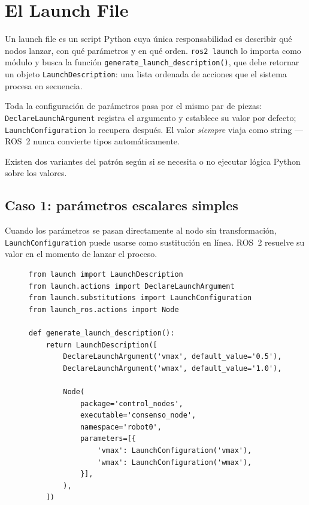 \section{El Launch File}

Un launch file es un script Python cuya única responsabilidad es describir qué nodos lanzar, con qué parámetros y en qué orden. \texttt{ros2 launch} lo importa como módulo y busca la función \texttt{generate\_launch\_description()}, que debe retornar un objeto \texttt{LaunchDescription}: una lista ordenada de acciones que el sistema procesa en secuencia.

Toda la configuración de parámetros pasa por el mismo par de piezas: \texttt{DeclareLaunchArgument} registra el argumento y establece su valor por defecto; \texttt{LaunchConfiguration} lo recupera después. El valor \textit{siempre} viaja como string —ROS~2 nunca convierte tipos automáticamente.

Existen dos variantes del patrón según si se necesita o no ejecutar lógica Python sobre los valores.

\subsection{Caso 1: parámetros escalares simples}

Cuando los parámetros se pasan directamente al nodo sin transformación, \texttt{LaunchConfiguration} puede usarse como sustitución en línea. ROS~2 resuelve su valor en el momento de lanzar el proceso.

\begin{figure}[H]
\centering
\begin{lstlisting}[style=python,
    caption={Launch file sin lógica Python. \texttt{LaunchConfiguration}
             actúa como sustitución diferida.},
    label={lst:launch_simple}]
from launch import LaunchDescription
from launch.actions import DeclareLaunchArgument
from launch.substitutions import LaunchConfiguration
from launch_ros.actions import Node

def generate_launch_description():
    return LaunchDescription([
        DeclareLaunchArgument('vmax', default_value='0.5'),
        DeclareLaunchArgument('wmax', default_value='1.0'),

        Node(
            package='control_nodes',
            executable='consenso_node',
            namespace='robot0',
            parameters=[{
                'vmax': LaunchConfiguration('vmax'),
                'wmax': LaunchConfiguration('wmax'),
            }],
        ),
    ])
\end{lstlisting}
\end{figure}

